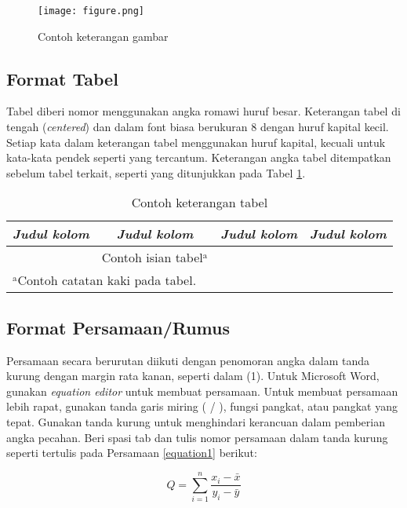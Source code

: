 \documentclass[conference, a4paper]{IEEEtran_ID}
\begin{document}
	\begin{figure}[htbp]
		\centerline{\texttt{[image: figure.png]}}
		\caption{Contoh keterangan gambar}
		\label{fig_sample}
	\end{figure}



\subsection{Format Tabel}
	
	Tabel diberi nomor menggunakan angka romawi huruf besar. Keterangan tabel di tengah (\textit{centered}) dan dalam font biasa berukuran 8 dengan huruf kapital kecil. Setiap kata dalam keterangan tabel menggunakan huruf kapital, kecuali untuk kata-kata pendek seperti yang tercantum. Keterangan angka tabel ditempatkan sebelum tabel terkait, seperti yang ditunjukkan pada Tabel \ref{tbl_sample}.

	\begin{table}[htbp]
		\caption{Contoh keterangan tabel}
		\begin{center}
		\begin{tabular}{|c|c|c|c|}
			\hline
			\textbf{\textit{Judul kolom}} & \textbf{\textit{Judul kolom}} & \textbf{\textit{Judul kolom}}& \textbf{\textit{Judul kolom}} \\
			\hline
			& Contoh isian tabel$^{\mathrm{a}}$& &  \\[2ex]
			\hline
			\multicolumn{4}{l}{$^{\mathrm{a}}$Contoh catatan kaki pada tabel.}
		\end{tabular}
		\label{tbl_sample}
		\end{center}
	\end{table}




\subsection{Format Persamaan/Rumus}
	Persamaan secara berurutan diikuti dengan penomoran angka dalam tanda kurung dengan margin rata kanan, seperti dalam (1). Untuk Microsoft Word, gunakan \textit{equation editor} untuk membuat persamaan. Untuk membuat persamaan lebih rapat, gunakan tanda garis miring ( / ), fungsi pangkat, atau pangkat yang tepat. Gunakan tanda kurung untuk menghindari kerancuan dalam pemberian angka pecahan. Beri spasi tab dan tulis nomor persamaan dalam tanda kurung seperti tertulis pada Persamaan \ref{equation1} berikut: 

	\begin{equation}	
		Q = \sum^n_{i=1} \frac{x_i - \bar{x}}{y_i - \bar{y}}
		\label{equation1}
	\end{equation}	
\end{document}
